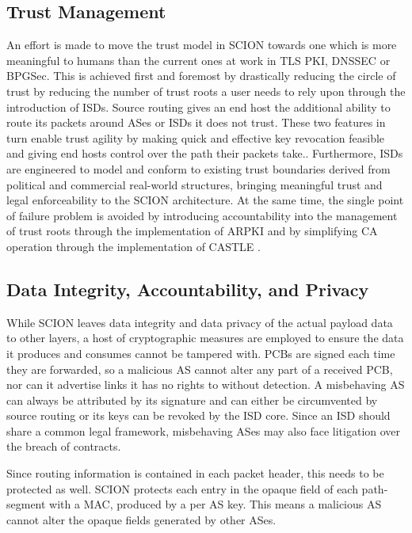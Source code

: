 \documentclass[../eva1_scion.tex]{subfiles}
\begin{document}
    \subsection{Trust Management}
    An effort is made to move the trust model in SCION towards one which is more meaningful to humans than the current ones at work in TLS PKI, DNSSEC or BPGSec. This is achieved first and foremost by drastically reducing the circle of trust by reducing the number of trust roots a user needs to rely upon through the introduction of ISDs. Source routing gives an end host the additional ability to route its packets around ASes or ISDs it does not trust. These two features in turn enable trust agility by making quick and effective key revocation feasible and giving end hosts control over the path their packets take.. Furthermore, ISDs are engineered to model and conform to existing trust boundaries derived from political and commercial real-world structures, bringing meaningful trust and legal enforceability to the SCION architecture. At the same time, the single point of failure problem is avoided by introducing accountability into the management of trust roots through the implementation of ARPKI \cite{arpki_2014, arpki_2018} and by simplifying CA operation through the implementation of CASTLE \cite{castle_2016}.

    \subsection{Data Integrity, Accountability, and Privacy}
    While SCION leaves data integrity and data privacy of the actual payload data to other layers, a host of cryptographic measures are employed to ensure the data it produces and consumes cannot be tampered with. PCBs are signed each time they are forwarded, so a malicious AS cannot alter any part of  a received PCB, nor can it advertise links it has no rights to without detection. A misbehaving AS can always be attributed by its signature and can either be circumvented by source routing or its keys can be revoked by the ISD core. Since an ISD should share a common legal framework, misbehaving ASes may also face litigation over the breach of contracts.

    Since routing information is contained in each packet header, this needs to be protected as well. SCION protects each entry in the opaque field of each path-segment with a MAC, produced by a per AS key. This means a malicious AS cannot alter the opaque fields generated by other ASes.
\end{document}
